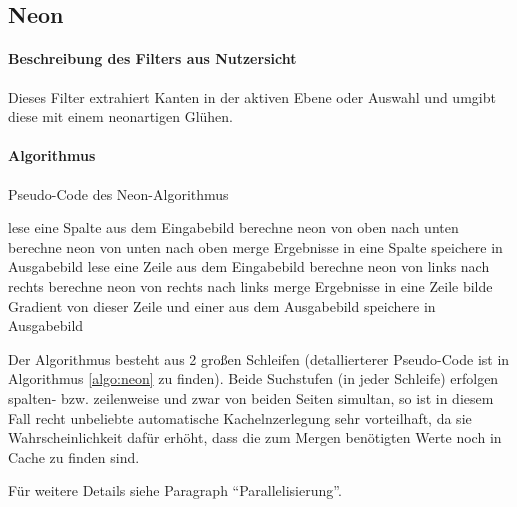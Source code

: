 \subsection{Neon}

\paragraph{Beschreibung des Filters aus Nutzersicht}
Dieses Filter extrahiert Kanten in der aktiven Ebene oder Auswahl und 
umgibt diese mit einem neonartigen Glühen.








\paragraph{Algorithmus} 
\begin{algorithm}[h]
\caption{Pseudo-Code des \glqq Neon\grqq-Algorithmus}
\label{algo:neon}
\begin{algorithmic}[1]
	\State lese eine Spalte aus dem Eingabebild
		\State berechne neon von oben nach unten
	\EndFor
		\State berechne neon von unten nach oben
	\EndFor
	\State merge Ergebnisse in eine Spalte
	\State speichere in Ausgabebild
\EndFor	
{}
	\State lese eine Zeile aus dem Eingabebild
		\State berechne neon von links nach rechts
	\EndFor
		\State berechne neon von rechts nach links
	\EndFor	
	\State merge Ergebnisse in eine Zeile
	\State \label{neon_datenabhaengigkeit} bilde Gradient von dieser Zeile und einer aus dem Ausgabebild
	\State speichere in Ausgabebild
\EndFor
\end{algorithmic}
\end{algorithm}

Der Algorithmus besteht aus 2 großen Schleifen (detallierterer Pseudo-Code 
ist in Algorithmus \ref{algo:neon} zu finden).
Beide Suchstufen (in jeder Schleife) erfolgen spalten- bzw. zeilenweise und zwar von beiden Seiten simultan,
so ist in diesem Fall recht unbeliebte automatische Kachelnzerlegung sehr vorteilhaft, da sie Wahrscheinlichkeit dafür erhöht, dass die zum Mergen benötigten Werte noch in Cache zu finden sind.

Für weitere Details siehe Paragraph ``Parallelisierung''.



